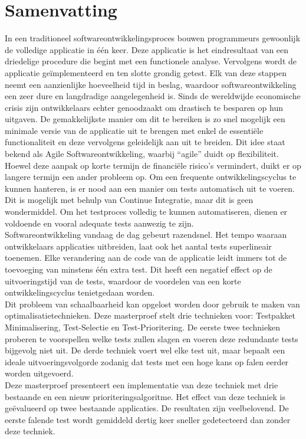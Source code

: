 
\chapter*{Samenvatting}
In een traditioneel softwareontwikkelingsproces bouwen programmeurs gewoonlijk de volledige applicatie in één keer. Deze applicatie is het eindresultaat van een driedelige procedure die begint met een functionele analyse. Vervolgens wordt de applicatie ge\"implementeerd en ten slotte grondig getest. Elk van deze stappen neemt een aanzienlijke hoeveelheid tijd in beslag, waardoor softwareontwikkeling een zeer dure en langdradige aangelegenheid is. Sinds de wereldwijde economische crisis zijn ontwikkelaars echter genoodzaakt om drastisch te besparen op hun uitgaven. De gemakkelijkste manier om dit te bereiken is zo snel mogelijk een minimale versie van de applicatie uit te brengen met enkel de essenti\"ele functionaliteit en deze vervolgens geleidelijk aan uit te breiden. Dit idee staat bekend als Agile Softwareontwikkeling, waarbij ``agile'' duidt op flexibiliteit.\\

\noindent Hoewel deze aanpak op korte termijn de financiële risico's vermindert, duikt er op langere termijn een ander probleem op. Om een frequente ontwikkelingscyclus te kunnen hanteren, is er nood aan een manier om tests automatisch uit te voeren. Dit is mogelijk met behulp van Continue Integratie, maar dit is geen wondermiddel. Om het testproces volledig te kunnen automatiseren, dienen er voldoende en vooral adequate tests aanwezig te zijn.\\

\noindent Softwareontwikkeling vandaag de dag gebeurt razendsnel. Het tempo waaraan ontwikkelaars applicaties uitbreiden, laat ook het aantal tests superlineair toenemen. Elke verandering aan de code van de applicatie leidt immers tot de toevoeging van minstens één extra test. Dit heeft een negatief effect op de uitvoeringstijd van de tests, waardoor de voordelen van een korte ontwikkelingscyclus tenietgedaan worden.\\

\noindent Dit probleem van schaalbaarheid kan opgelost worden door gebruik te maken van optimalisatietechnieken. Deze masterproef stelt drie technieken voor: Testpakket Minimalisering, Test-Selectie en Test-Prioritering. De eerste twee technieken proberen te voorspellen welke tests zullen slagen en voeren deze redundante tests bijgevolg niet uit. De derde techniek voert wel elke test uit, maar bepaalt een ideale uitvoeringsvolgorde zodanig dat tests met een hoge kans op falen eerder worden uitgevoerd.\\

\noindent Deze masterproef presenteert een implementatie van deze techniek met drie bestaande en een nieuw prioriteringsalgoritme. Het effect van deze techniek is ge\"evalueerd op twee bestaande applicaties. De resultaten zijn veelbelovend. De eerste falende test wordt gemiddeld dertig keer sneller gedetecteerd dan zonder deze techniek.